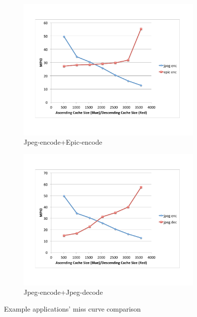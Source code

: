 \documentclass{acm_proc_article-sp}
\begin{document}
\begin{figure}
\begin{subfigure}[b]{0.22\textwidth}
    \includegraphics[width=\textwidth]{figs/jpeg-encode+epic-encode.pdf}
    \caption{Jpeg-encode+Epic-encode}
    \label{fig:jpeg-decode}
  \end{subfigure}
  \begin{subfigure}[b]{0.22\textwidth}
    \includegraphics[width=\textwidth]{figs/jpeg-encode+jpeg-decode.pdf}
    \caption{Jpeg-encode+Jpeg-decode}
    \label{fig:jpeg-encode}
  \end{subfigure}
  \caption{Example applications' miss curve comparison}

  \label{fig:miss-curve-comp}
\end{figure}
\end{document}
